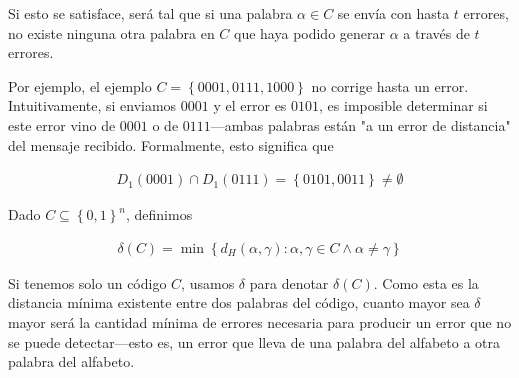 \documentclass[a4paper]{article}
\begin{document}
Si esto se satisface, será tal que si una palabra $\alpha \in C$ se envía con hasta
$t$ errores, no existe ninguna otra palabra en $C$ que haya podido generar
$\alpha$ a través de $t$ errores.

Por ejemplo, el ejemplo $C = \left\{ 0001, 0111, 1000 \right\} $ no corrige 
hasta un error. Intuitivamente, si enviamos $0001$ y el error 
es $0101$, es imposible determinar si este error vino de $0001$
o de $0111$---ambas palabras están "a un error de distancia"
del mensaje recibido. Formalmente, esto significa que 

\begin{align*}
    D_1(0001) \cap D_1(0111) = \left\{ 0101, 0011 \right\} \neq \emptyset
\end{align*}



\begin{definition}[$\delta(C)$]
    Dado $C \subseteq \left\{ 0, 1 \right\}^{n} $, definimos 

    \begin{align*}
        \delta(C) = \min \left\{ d_H (\alpha, \gamma) : \alpha, \gamma \in C \land  \alpha \neq \gamma \right\} 
    \end{align*}
\end{definition}

Si tenemos solo un código $C$, usamos $\delta$ para denotar $\delta(C)$. Como
esta es la distancia mínima existente entre dos palabras del código, cuanto
mayor sea $\delta$ mayor será la cantidad mínima de errores necesaria para
producir un error que no se puede detectar---esto es, un error que lleva de una
palabra del alfabeto a otra palabra del alfabeto.
\end{document}
